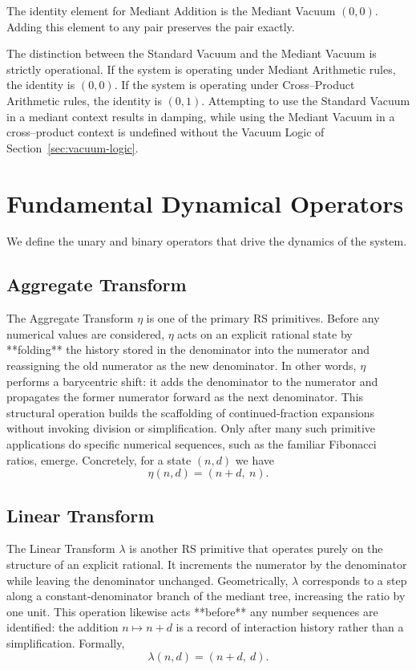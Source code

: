 \documentclass[11pt, letterpaper]{article}
\newcommand{\etaOp}{\eta}
\newcommand{\lambdaOp}{\lambda}
\begin{document}
The identity element for Mediant Addition is the Mediant Vacuum $(0,0)$.  Adding this element to any pair preserves the pair exactly.

The distinction between the Standard Vacuum and the Mediant Vacuum is strictly operational.  If the system is operating under Mediant Arithmetic rules, the identity is $(0,0)$.  If the system is operating under Cross–Product Arithmetic rules, the identity is $(0,1)$.  Attempting to use the Standard Vacuum in a mediant context results in damping, while using the Mediant Vacuum in a cross–product context is undefined without the Vacuum Logic of Section~\ref{sec:vacuum-logic}.

\section{Fundamental Dynamical Operators}

We define the unary and binary operators that drive the dynamics of the system.

\subsection{Aggregate Transform}
The Aggregate Transform $\etaOp$ is one of the primary RS primitives.  Before any numerical values are considered, $\etaOp$ acts on an explicit rational state by **folding** the history stored in the denominator into the numerator and reassigning the old numerator as the new denominator.  In other words, $\etaOp$ performs a barycentric shift: it adds the denominator to the numerator and propagates the former numerator forward as the next denominator.  This structural operation builds the scaffolding of continued‐fraction expansions without invoking division or simplification.  Only after many such primitive applications do specific numerical sequences, such as the familiar Fibonacci ratios, emerge.  Concretely, for a state $(n,d)$ we have
\[
\etaOp(n,d) = (n+d,\ n).
\]

\subsection{Linear Transform}
The Linear Transform $\lambdaOp$ is another RS primitive that operates purely on the structure of an explicit rational.  It increments the numerator by the denominator while leaving the denominator unchanged.  Geometrically, $\lambdaOp$ corresponds to a step along a constant‐denominator branch of the mediant tree, increasing the ratio by one unit.  This operation likewise acts **before** any number sequences are identified: the addition $n\mapsto n+d$ is a record of interaction history rather than a simplification.  Formally,
\[
\lambdaOp(n,d) = (n+d,\ d).
\]
\end{document}
